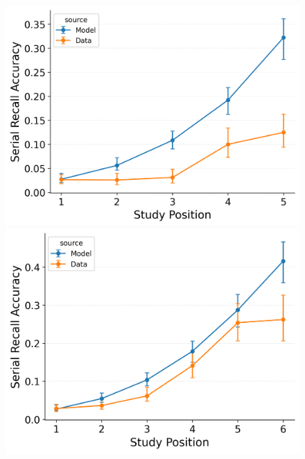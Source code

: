 \documentclass[
  man,
  floatsintext,
  longtable,
  nolmodern,
  notxfonts,
  notimes,
  draftfirst,
  colorlinks=true,linkcolor=blue,citecolor=blue,urlcolor=blue]{apa7}
\begin{document}
\begin{figure}
\begin{minipage}{0.33\linewidth}
\includegraphics{figures/Gordon2021_CRU_with_Pre-Expt_and_Primacy__and_ContextTerm_Confusable_Fitting_omission_error_rate_LL5.png}\end{minipage}%
%
\begin{minipage}{0.33\linewidth}
\includegraphics{figures/Gordon2021_CRU_with_Pre-Expt_and_Primacy__and_ContextTerm_Confusable_Fitting_omission_error_rate_LL6.png}\end{minipage}%
%
\begin{minipage}{0.33\linewidth}

\end{minipage}
\end{figure}
\end{document}
